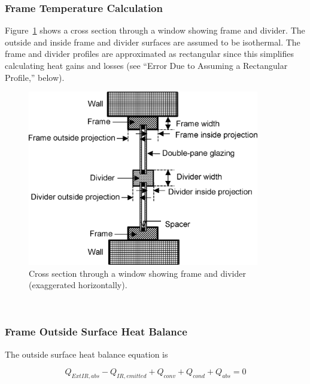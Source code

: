 \subsubsection{Frame Temperature Calculation}\label{frame-temperature-calculation}

Figure~\ref{fig:cross-section-through-a-window-showing-frame} shows a cross section through a window showing frame and divider. The outside and inside frame and divider surfaces are assumed to be isothermal. The frame and divider profiles are approximated as rectangular since this simplifies calculating heat gains and losses (see ``Error Due to Assuming a Rectangular Profile,'' below).

\begin{figure}[hbtp] %
\centering
\includegraphics[width=0.9\textwidth, height=0.9\textheight, keepaspectratio=true]{media/image1557.png}
\caption{  Cross section through a window showing frame and divider (exaggerated horizontally). \protect \label{fig:cross-section-through-a-window-showing-frame}}
\end{figure}

\textbf{~}

\subsubsection{Frame Outside Surface Heat Balance}\label{frame-outside-surface-heat-balance}

The outside surface heat balance equation is

\begin{equation}
{Q_{ExtIR,abs}} - {Q_{IR,emitted}} + {Q_{conv}} + {Q_{cond}} + {Q_{abs}} = 0
\end{equation}


